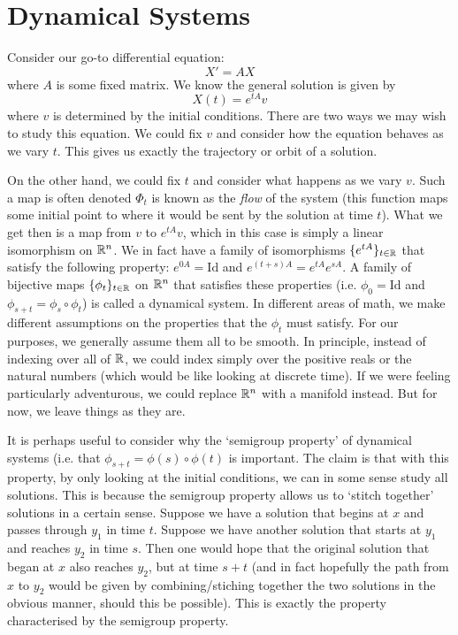 
\section{Dynamical Systems}\label{sec:dyn-systems}
Consider our go-to differential equation:
$$ X' = AX $$
where $A$ is some fixed matrix. We know the general solution is given by $$ X(t) = e^{tA}v $$ where $v$ is determined by the initial conditions. There are two ways we may wish to study this equation. We could fix $v$ and consider how the equation behaves as we vary $t$. This gives us exactly the trajectory or orbit of a solution.

On the other hand, we could fix $t$ and consider what happens as we vary $v$. Such a map is often denoted $\Phi_t$ is known as the \textit{flow} of the system (this function maps some initial point to where it would be sent by the solution at time $t$). What we get then is a map from $v$ to $e^{tA}v$, which in this case is simply a linear isomorphism on $\mathbb{R}^n$. We in fact have a family of isomorphisms $\{e^{tA}\}_{t \in \mathbb{R}}$ that satisfy the following property: $e^{0A} = \text{Id}$ and $e^{(t + s)A} = e^{tA} e^{sA}$. A family of bijective maps $\{\phi_t\}_{t \in \mathbb{R}}$ on $\mathbb{R}^n$ that satisfies these properties (i.e. $\phi_0 = \text{Id}$ and $\phi_{s + t} = \phi_s \circ \phi_t$) is called a dynamical system. In different areas of math, we make different assumptions on the properties that the $\phi_t$ must satisfy. For our purposes, we generally assume them all to be smooth. In principle, instead of indexing over all of $\mathbb{R}$, we could index simply over the positive reals or the natural numbers (which would be like looking at discrete time). If we were feeling particularly adventurous, we could replace $\mathbb{R}^n$ with a manifold instead. But for now, we leave things as they are.

It is perhaps useful to consider why the `semigroup property' of dynamical systems (i.e. that $\phi_{s + t} = \phi(s) \circ \phi(t)$ is important. The claim is that with this property, by only looking at the initial conditions, we can in some sense study all solutions. This is because the semigroup property allows us to `stitch together' solutions in a certain sense. Suppose we have a solution that begins at $x$ and passes through $y_1$ in time $t$. Suppose we have another solution that starts at $y_1$ and reaches $y_2$ in time $s$. Then one would hope that the original solution that began at $x$ also reaches $y_2$, but at time $s + t$ (and in fact hopefully the path from $x$ to $y_2$ would be given by combining/stiching together the two solutions in the obvious manner, should this be possible). This is exactly the property characterised by the semigroup property.

